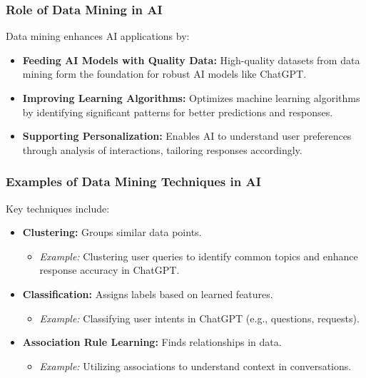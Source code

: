 \documentclass[aspectratio=169]{beamer}
\begin{document}
\begin{frame}[fragile]
    \frametitle{Role of Data Mining in AI}
    Data mining enhances AI applications by:
    \begin{itemize}
        \item \textbf{Feeding AI Models with Quality Data:}
        High-quality datasets from data mining form the foundation for robust AI models like ChatGPT.
        
        \item \textbf{Improving Learning Algorithms:}
        Optimizes machine learning algorithms by identifying significant patterns for better predictions and responses.
        
        \item \textbf{Supporting Personalization:}
        Enables AI to understand user preferences through analysis of interactions, tailoring responses accordingly.
    \end{itemize}
\end{frame}

\begin{frame}[fragile]
    \frametitle{Examples of Data Mining Techniques in AI}
    Key techniques include:
    \begin{itemize}
        \item \textbf{Clustering:} Groups similar data points.
        \begin{itemize}
            \item \textit{Example:} Clustering user queries to identify common topics and enhance response accuracy in ChatGPT.
        \end{itemize}
        
        \item \textbf{Classification:} Assigns labels based on learned features.
        \begin{itemize}
            \item \textit{Example:} Classifying user intents in ChatGPT (e.g., questions, requests).
        \end{itemize}
        
        \item \textbf{Association Rule Learning:} Finds relationships in data.
        \begin{itemize}
            \item \textit{Example:} Utilizing associations to understand context in conversations.
        \end{itemize}
    \end{itemize}
\end{frame}
\end{document}
